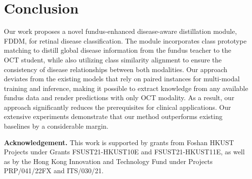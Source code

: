 \documentclass[runningheads]{llncs}
\newcommand{\wdaicmnt}[1]{{\color[rgb]{0.9,0.1,0.1}{(WD:#1)}}}
\begin{document}

\section{Conclusion}
Our work proposes a novel fundus-enhanced disease-aware distillation module, FDDM, for retinal disease classification. The module incorporates class prototype matching to distill global disease information from the fundus teacher to the OCT student, while also utilizing class similarity alignment to ensure the consistency of disease relationships between both modalities. Our approach deviates from the existing models that rely on paired instances for multi-modal training and inference, making it possible to extract knowledge from any available fundus data and render predictions with only OCT modality. As a result, our approach significantly reduces the prerequisites for clinical applications. Our extensive experiments demonstrate that our method outperforms existing baselines by a considerable margin.

\vspace{6pt}
\noindent
\textbf{Acknowledgement.} This work is supported by grants from Foshan HKUST Projects under Grants FSUST21-HKUST10E and FSUST21-HKUST11E, as well as by the Hong Kong Innovation and Technology Fund under Projects PRP/041/22FX and ITS/030/21.





%
%
% 
% 

\end{document}
